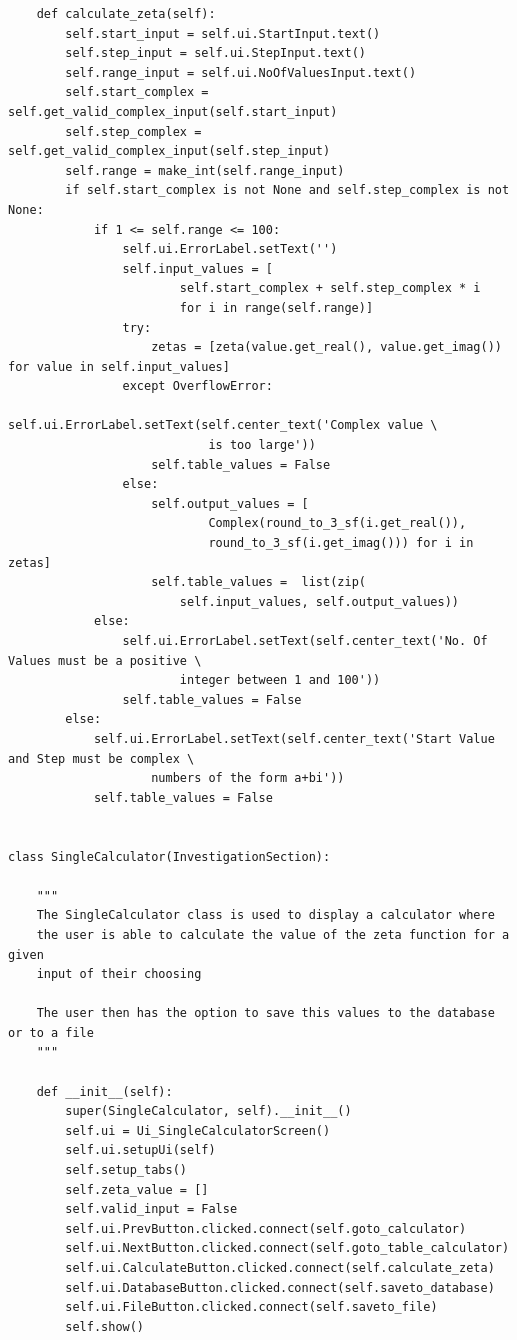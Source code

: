 \documentclass[12pt]{article}
\begin{document}
\begin{lstlisting}
    def calculate_zeta(self):
        self.start_input = self.ui.StartInput.text()
        self.step_input = self.ui.StepInput.text()
        self.range_input = self.ui.NoOfValuesInput.text()
        self.start_complex = self.get_valid_complex_input(self.start_input)
        self.step_complex = self.get_valid_complex_input(self.step_input)
        self.range = make_int(self.range_input)
        if self.start_complex is not None and self.step_complex is not None:
            if 1 <= self.range <= 100:
                self.ui.ErrorLabel.setText('')
                self.input_values = [
                        self.start_complex + self.step_complex * i
                        for i in range(self.range)]
                try:
                    zetas = [zeta(value.get_real(), value.get_imag()) for value in self.input_values]
                except OverflowError:
                    self.ui.ErrorLabel.setText(self.center_text('Complex value \
                            is too large'))
                    self.table_values = False
                else:
                    self.output_values = [
                            Complex(round_to_3_sf(i.get_real()),
                            round_to_3_sf(i.get_imag())) for i in zetas]
                    self.table_values =  list(zip(
                        self.input_values, self.output_values))
            else:
                self.ui.ErrorLabel.setText(self.center_text('No. Of Values must be a positive \
                        integer between 1 and 100'))
                self.table_values = False
        else:
            self.ui.ErrorLabel.setText(self.center_text('Start Value and Step must be complex \
                    numbers of the form a+bi'))
            self.table_values = False


class SingleCalculator(InvestigationSection):

    """
    The SingleCalculator class is used to display a calculator where
    the user is able to calculate the value of the zeta function for a given
    input of their choosing

    The user then has the option to save this values to the database or to a file
    """

    def __init__(self):
        super(SingleCalculator, self).__init__()
        self.ui = Ui_SingleCalculatorScreen()
        self.ui.setupUi(self)
        self.setup_tabs()
        self.zeta_value = []
        self.valid_input = False
        self.ui.PrevButton.clicked.connect(self.goto_calculator)
        self.ui.NextButton.clicked.connect(self.goto_table_calculator)
        self.ui.CalculateButton.clicked.connect(self.calculate_zeta)
        self.ui.DatabaseButton.clicked.connect(self.saveto_database)
        self.ui.FileButton.clicked.connect(self.saveto_file)
        self.show()


\end{lstlisting}
\end{document}
